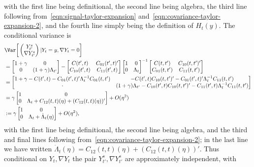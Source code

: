 \documentclass{article}
\begin{document}
	with the first line being definitional, the second line being algebra, the third line following from~\eqref{eqn:signal-taylor-expansion} and~\eqref{eqn:covariance-taylor-expansion-2}, and the fourth line simply being the definition of $H_t(y)$. The conditional variance is 
	\begin{align*}
		& \Var\bigg[
		\begin{pmatrix}
			Y_{t'}^s \\
			\nabla Y_{t'}^s
		\end{pmatrix}|Y_t = y, \nabla Y_t = 0\bigg] \\
		& = 
		\begin{bmatrix}
			1  + \gamma & 0 \\
			0 & (1 + \gamma) \Lambda_{t'}
		\end{bmatrix}
		- 
		\begin{bmatrix}
			C(t',t) & C_{01}(t',t)' \\
			C_{10}(t',t) & C_{11}(t',t)
		\end{bmatrix}
		\begin{bmatrix}
			1 & 0 \\
			0 & \Lambda_{t}
		\end{bmatrix}^{-1}
		\begin{bmatrix}
			C(t,t') & C_{10}(t,t')' \\
			C_{01}(t,t') & C_{11}(t,t')
		\end{bmatrix} \\
		& = 
		\begin{bmatrix}
			1 + \gamma - C(t',t) - C_{01}(t',t)'\Lambda_t^{-1}C_{01}(t,t') & 
			- C(t',t) C_{10}(t,t')' - C_{01}(t',t)' \Lambda_t^{-1}C_{11}(t,t') \\
			\cdot & (1 + \gamma) \Lambda_{t'} - C_{10}(t',t) C_{10}(t,t')' - C_{11}(t',t)\Lambda_{t}^{-1}C_{11}(t,t')
		\end{bmatrix}
		\\
		& =
		\gamma 
		\begin{bmatrix}
			1 & 0 \\
			0 & \Lambda_t + C_{12}(t,t)(\eta) + (C_{12}(t,t)(\eta))'
		\end{bmatrix}
		+ O(\eta^2) \\
		& := 
		\gamma 
		\begin{bmatrix}
			1 & 0 \\
			0 & \Lambda_t + \dot{\Lambda}_t(\eta)
		\end{bmatrix}
		+ O(\eta^2),	
	\end{align*}
	with the first line being definitional, the second line being algebra, and the third and final lines following from~\eqref{eqn:covariance-taylor-expansion-2}; in the last line we have written $\dot{\Lambda}_t(\eta) = C_{12}(t,t)(\eta) + (C_{12}(t,t)(\eta))'$. Thus conditional on $Y_t,\nabla Y_t$ the pair $Y_{t'}^s,\nabla Y_{t'}^s$ are approximately independent, with
\end{document}
